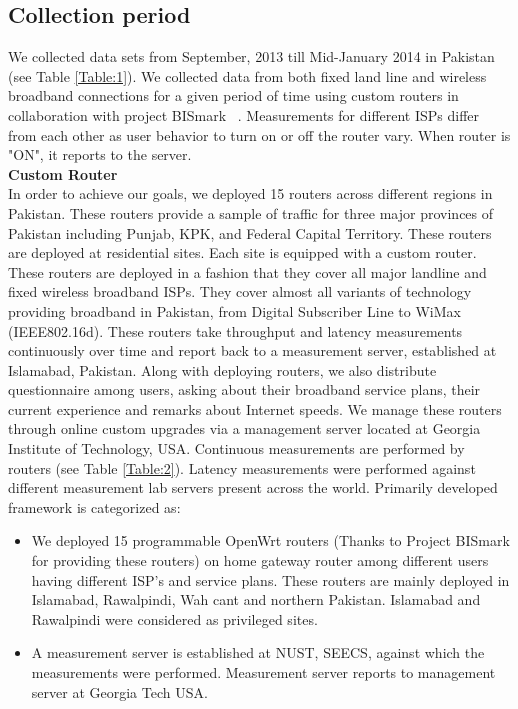 \documentclass{sig-alternate-10pt}
\begin{document}
\begin{sloppypar}
\subsection {Collection period}
We collected data sets from September, 2013 till Mid-January 2014 in Pakistan (see Table \ref{Table:1}). We collected data from both fixed land line and wireless broadband connections for a given period of time using custom routers in collaboration with project BISmark ~\cite{29}. Measurements for different ISPs differ from each other as user behavior to turn on or off the router vary. When router is "ON", it reports to the server.\\
\textbf{Custom Router}\\
\indent In order to achieve our goals, we deployed 15 routers across different regions in Pakistan. These routers provide a sample of traffic for three major provinces of Pakistan including Punjab, KPK, and Federal Capital Territory. These routers are deployed at residential sites. Each site is equipped with a custom router. These routers are deployed in a fashion that they cover all major landline and fixed wireless broadband ISPs. They cover almost all variants of technology providing broadband in Pakistan, from Digital Subscriber Line to WiMax (IEEE802.16d). These routers take throughput and latency measurements continuously over time and report back to a measurement server, established at Islamabad, Pakistan. Along with deploying routers, we also distribute questionnaire among users, asking about their broadband service plans, their current experience and remarks about Internet speeds.  We manage these routers through online custom upgrades via a management server located at Georgia Institute of Technology, USA. Continuous measurements are performed by routers (see Table \ref{Table:2}). Latency measurements were performed against different measurement lab servers present across the world.
Primarily developed framework is categorized as:
\begin{itemize}
  \item We deployed 15 programmable OpenWrt routers (Thanks to Project BISmark for providing these routers) on home gateway router among different users having different ISP’s and service plans. These routers are mainly deployed in Islamabad, Rawalpindi, Wah cant and northern Pakistan. Islamabad and Rawalpindi were considered as privileged sites.
  \item A measurement server is established at NUST, SEECS, against which the measurements were performed. Measurement server reports to management server at Georgia Tech USA.

\end{itemize}
\end{sloppypar}
\end{document}
